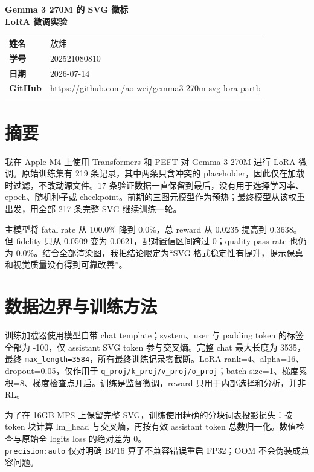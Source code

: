 \documentclass[UTF8,a4paper,zihao=5,fontset=none]{ctexart}
\renewcommand{\arraystretch}{1.18}
\newcommand{\repo}{https://github.com/ao-wei/gemma3-270m-svg-lora-partb}
\begin{document}
\thispagestyle{fancy}
\vspace*{27mm}
\begin{center}
  {\fontsize{24}{34}\selectfont\bfseries\color{deepblue}
    Gemma 3 270M 的 SVG 徽标\\[2mm]LoRA 微调实验\par}
  \vspace{19mm}
  \renewcommand{\arraystretch}{1.45}
  \begin{tabularx}{0.82\textwidth}{>{\bfseries}p{28mm}X}
    \rowcolor{accent}\color{white}姓名 & \color{white}敖炜 \\
    学号 & 202521080810 \\
    \rowcolor{lightrow}日期 & 2026-07-14 \\
    GitHub & {\small\url{\repo}} \\
  \end{tabularx}
\end{center}
\vfill
\clearpage

\section*{摘要}

我在 Apple M4 上使用 Transformers 和 PEFT 对 Gemma 3 270M 进行 LoRA 微调。原始训练集有 219 条记录，其中两条只含冲突的 placeholder，因此仅在加载时过滤，不改动源文件。17 条验证数据一直保留到最后，没有用于选择学习率、epoch、随机种子或 checkpoint。前期的三图元模型作为预热；最终模型从该权重出发，用全部 217 条完整 SVG 继续训练一轮。

主模型将 fatal rate 从 100.0\% 降到 0.0\%，总 reward 从 0.0235 提高到 0.3638。但 fidelity 只从 0.0509 变为 0.0621，配对置信区间跨过 0；quality pass rate 也仍为 0.0\%。结合全部渲染图，我把结论限定为“SVG 格式稳定性有提升，提示保真和视觉质量没有得到可靠改善”。

\section{数据边界与训练方法}

训练加载器使用模型自带 chat template；system、user 与 padding token 的标签全部为 -100，仅 assistant SVG token 参与交叉熵。完整 chat 最大长度为 3535，最终 \texttt{max\_length=3584}，所有最终训练记录零截断。LoRA rank=4、alpha=16、dropout=0.05，仅作用于 \texttt{q\_proj/k\_proj/v\_proj/o\_proj}；batch size=1、梯度累积=8、梯度检查点开启。训练是监督微调，reward 只用于内部选择和分析，并非 RL。

为了在 16GB MPS 上保留完整 SVG，训练使用精确的分块词表投影损失：按 token 块计算 lm\_head 与交叉熵，再按有效 assistant token 总数归一化。数值检查与原始全 logits loss 的绝对差为 0。\\\texttt{precision:auto} 仅对明确 BF16 算子不兼容错误重启 FP32；OOM 不会伪装成兼容问题。
\end{document}
